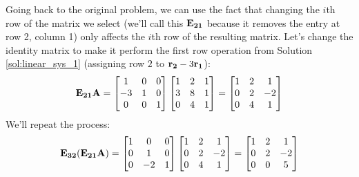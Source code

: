 \documentclass[../main.tex]{subfiles}
\begin{document}
\begin{solution}
	Going back to the original problem, we can use the fact that changing the
	$i$th row of the matrix we select (we'll call this $\mathbf{E_{21}}$ because it removes the entry at row 2, column 1)
	only affects the $i$th row of the resulting matrix. Let's change the identity matrix to make it perform the first
	row operation from Solution \ref{sol:linear_sys_1} (assigning row $2$ to $\mathbf{r_2}-3\mathbf{r_1}$):
	\[\mathbf{E_{21}}\mathbf{A}=\begin{bmatrix}1&0&0\\-3&1&0\\0&0&1\end{bmatrix}\begin{bmatrix}1&2&1\\3&8&1\\0&4&1\end{bmatrix}=\begin{bmatrix}1&2&1\\0&2&-2\\0&4&1\end{bmatrix}\]
	We'll repeat the process:
	\[\mathbf{E_{32}}(\mathbf{E_{21}\mathbf{A}})=\begin{bmatrix}1&0&0\\0&1&0\\0&-2&1\end{bmatrix}\begin{bmatrix}1&2&1\\0&2&-2\\0&4&1\end{bmatrix}=\begin{bmatrix}1&2&1\\0&2&-2\\0&0&5\end{bmatrix}\]
\end{solution}
\end{document}
